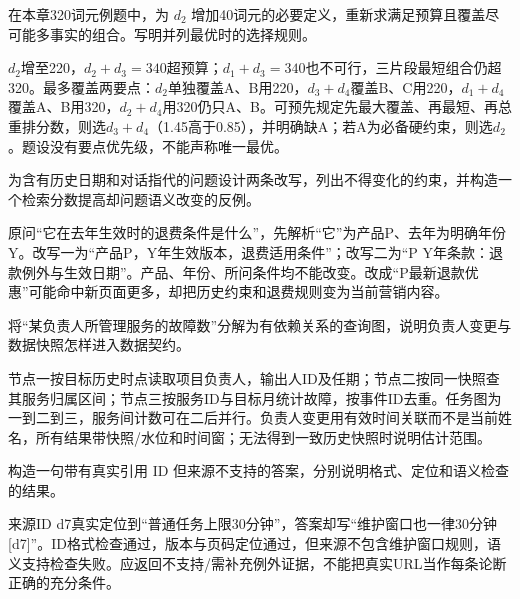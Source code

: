 \begin{exercises}
\begin{exercise} 在本章320词元例题中，为 $d_2$ 增加40词元的必要定义，重新求满足预算且覆盖尽可能多事实的组合。写明并列最优时的选择规则。

\begin{solution}
$d_2$增至220，$d_2+d_3=340$超预算；$d_1+d_3=340$也不可行，三片段最短组合仍超320。最多覆盖两要点：$d_2$单独覆盖A、B用220，$d_3+d_4$覆盖B、C用220，$d_1+d_4$覆盖A、B用320，$d_2+d_4$用320仍只A、B。可预先规定先最大覆盖、再最短、再总重排分数，则选$d_3+d_4$（1.45高于0.85），并明确缺A；若A为必备硬约束，则选$d_2$。题设没有要点优先级，不能声称唯一最优。
\end{solution}
\end{exercise}

\begin{exercise}\optional 为含有历史日期和对话指代的问题设计两条改写，列出不得变化的约束，并构造一个检索分数提高却问题语义改变的反例。

\begin{solution}
原问“它在去年生效时的退费条件是什么”，先解析“它”为产品P、去年为明确年份Y。改写一为“产品P，Y年生效版本，退费适用条件”；改写二为“P Y年条款：退款例外与生效日期”。产品、年份、所问条件均不能改变。改成“P最新退款优惠”可能命中新页面更多，却把历史约束和退费规则变为当前营销内容。
\end{solution}
\end{exercise}

\begin{exercise}\optional 将“某负责人所管理服务的故障数”分解为有依赖关系的查询图，说明负责人变更与数据快照怎样进入数据契约。

\begin{solution}
节点一按目标历史时点读取项目负责人，输出人ID及任期；节点二按同一快照查其服务归属区间；节点三按服务ID与目标月统计故障，按事件ID去重。任务图为一到二到三，服务间计数可在二后并行。负责人变更用有效时间关联而不是当前姓名，所有结果带快照/水位和时间窗；无法得到一致历史快照时说明估计范围。
\end{solution}
\end{exercise}

\begin{exercise} 构造一句带有真实引用 ID 但来源不支持的答案，分别说明格式、定位和语义检查的结果。

\begin{solution}
来源ID d7真实定位到“普通任务上限30分钟”，答案却写“维护窗口也一律30分钟[d7]”。ID格式检查通过，版本与页码定位通过，但来源不包含维护窗口规则，语义支持检查失败。应返回不支持/需补充例外证据，不能把真实URL当作每条论断正确的充分条件。
\end{solution}
\end{exercise}


\end{exercises}
